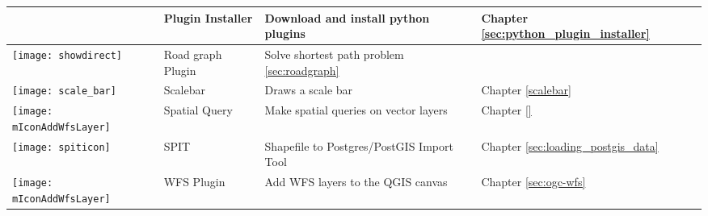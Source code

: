 {\begin{longtable}{|p{1.2cm}|p{3.8cm}|p{7.5cm}|p{3cm}|}
 & Plugin Installer \index{plugins!Plugin Installer} & Download and install python plugins & Chapter \ref{sec:python_plugin_installer}\\
\hline
\texttt{[image: showdirect]}
 & Road graph Plugin \index{plugins!road graph} & Solve shortest path problem \ref{sec:roadgraph} \\
\hline
\texttt{[image: scale\_bar]}
 & Scalebar \index{plugins!scalebar}& Draws a scale bar & Chapter \ref{scalebar} \\
\hline
\texttt{[image: mIconAddWfsLayer]}
 & Spatial Query & Make spatial queries on vector layers & Chapter \ref{} \\
\hline
\texttt{[image: spiticon]}
 & SPIT \index{plugins!spit} & Shapefile to Postgres/PostGIS Import Tool & Chapter \ref{sec:loading_postgis_data} \\
 \hline
\texttt{[image: mIconAddWfsLayer]}
 & WFS Plugin & Add WFS layers to the QGIS canvas & Chapter \ref{sec:ogc-wfs} \\
\hline
\end{longtable}}

\newpage

